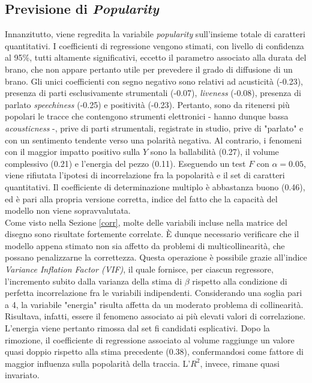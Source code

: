 \documentclass[fleqn,10pt]{SelfArx} %
\begin{document}
\subsection{Previsione di \textit{Popularity}}
Innanzitutto, viene regredita la variabile \textit{popularity} sull'insieme totale di caratteri quantitativi. I coefficienti di regressione vengono stimati, con livello di confidenza al 95\%, tutti altamente significativi, eccetto il parametro associato alla durata del brano, che non appare pertanto utile per prevedere il grado di diffusione di un brano. Gli unici coefficienti con segno negativo sono relativi ad acusticità (-0.23), presenza di parti esclusivamente strumentali (-0.07), \textit{liveness} (-0.08), presenza di parlato \textit{speechiness} (-0.25) e positività (-0.23). Pertanto, sono da ritenersi più popolari le tracce che contengono strumenti elettronici - hanno dunque bassa \textit{acousticness} -, prive di parti strumentali, registrate in studio, prive di "parlato" e con un sentimento tendente verso una polarità negativa. Al contrario, i fenomeni con il maggior impatto positivo sulla $Y$ sono la ballabilità (0.27), il volume complessivo (0.21) e l'energia del pezzo (0.11). Eseguendo un test $F$ con $\alpha=0.05$, viene rifiutata l'ipotesi di incorrelazione fra la popolarità e il set di caratteri quantitativi. Il coefficiente di determinazione multiplo è abbastanza buono (0.46), ed è pari alla propria versione corretta, indice del fatto che la capacità del modello non viene sopravvalutata.\\
Come visto nella Sezione \ref{corr}, molte delle variabili incluse nella matrice del disegno sono risultate fortemente correlate. È dunque necessario verificare che il modello appena stimato non sia affetto da problemi di multicollinearità, che possano penalizzarne la correttezza. Questa operazione è possibile grazie all'indice \textit{Variance Inflation Factor (VIF)}, il quale fornisce, per ciascun regressore, l'incremento subito dalla varianza della stima di $\beta$ rispetto alla condizione di perfetta incorrelazione fra le variabili indipendenti. Considerando una soglia pari a 4, la variabile "energia" risulta affetta da un moderato problema di collinearità. Risultava, infatti, essere il fenomeno associato ai più elevati valori di correlazione. L'energia viene pertanto rimossa dal set fi candidati esplicativi. Dopo la rimozione, il coefficiente di regressione associato al volume raggiunge un valore quasi doppio rispetto alla stima precedente (0.38), confermandosi come fattore di maggior influenza sulla popolarità della traccia. L'$R^2$, invece, rimane quasi invariato.\\
\end{document}
